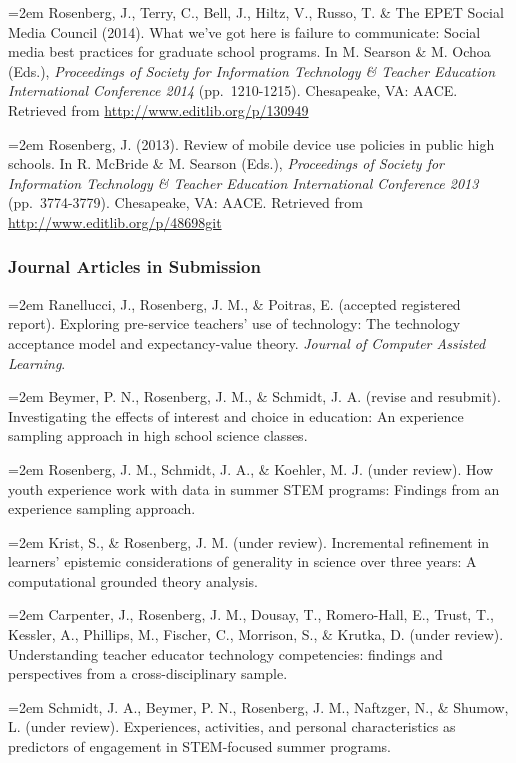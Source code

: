 \documentclass[14,]{article}
\begin{document}
\hangindent=2em Rosenberg, J., Terry, C., Bell, J., Hiltz, V., Russo, T.
\& The EPET Social Media Council (2014). What we've got here is failure
to communicate: Social media best practices for graduate school
programs. In M. Searson \& M. Ochoa (Eds.), \emph{Proceedings of Society
for Information Technology \& Teacher Education International Conference
2014} (pp.~1210-1215). Chesapeake, VA: AACE. Retrieved from
\url{http://www.editlib.org/p/130949}

\hangindent=2em Rosenberg, J. (2013). Review of mobile device use
policies in public high schools. In R. McBride \& M. Searson (Eds.),
\emph{Proceedings of Society for Information Technology \& Teacher
Education International Conference 2013} (pp.~3774-3779). Chesapeake,
VA: AACE. Retrieved from \url{http://www.editlib.org/p/48698git}

\hypertarget{journal-articles-in-submission}{%
\subsubsection{Journal Articles in
Submission}\label{journal-articles-in-submission}}

\hangindent=2em Ranellucci, J., Rosenberg, J. M., \& Poitras, E.
(accepted registered report). Exploring pre-service teachers' use of
technology: The technology acceptance model and expectancy-value theory.
\emph{Journal of Computer Assisted Learning}.

\hangindent=2em Beymer, P. N., Rosenberg, J. M., \& Schmidt, J. A.
(revise and resubmit). Investigating the effects of interest and choice
in education: An experience sampling approach in high school science
classes.

\hangindent=2em Rosenberg, J. M., Schmidt, J. A., \& Koehler, M. J.
(under review). How youth experience work with data in summer STEM
programs: Findings from an experience sampling approach.

\hangindent=2em Krist, S., \& Rosenberg, J. M. (under review).
Incremental refinement in learners' epistemic considerations of
generality in science over three years: A computational grounded theory
analysis.

\hangindent=2em Carpenter, J., Rosenberg, J. M., Dousay, T.,
Romero-Hall, E., Trust, T., Kessler, A., Phillips, M., Fischer, C.,
Morrison, S., \& Krutka, D. (under review). Understanding teacher
educator technology competencies: findings and perspectives from a
cross-disciplinary sample.

\hangindent=2em Schmidt, J. A., Beymer, P. N., Rosenberg, J. M.,
Naftzger, N., \& Shumow, L. (under review). Experiences, activities, and
personal characteristics as predictors of engagement in STEM-focused
summer programs.
\end{document}
